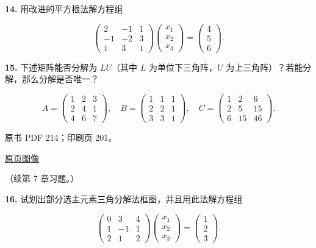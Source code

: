 \documentclass[
  10pt,
  fontset=fandol]{ctexart}
\begin{document}
\textbf{14.} 用改进的平方根法解方程组

\[
\begin{pmatrix}
2&-1&1\\
-1&-2&3\\
1&3&1
\end{pmatrix}
\begin{pmatrix}x_1\\x_2\\x_3\end{pmatrix}
=\begin{pmatrix}4\\5\\6\end{pmatrix}.
\]

\textbf{15.} 下述矩阵能否分解为 \(LU\)（其中 \(L\) 为单位下三角阵，\(U\)
为上三角阵）？若能分解，那么分解是否唯一？

\[
A=\begin{pmatrix}1&2&3\\2&4&1\\4&6&7\end{pmatrix},\quad
B=\begin{pmatrix}1&1&1\\2&2&1\\3&3&1\end{pmatrix},\quad
C=\begin{pmatrix}1&2&6\\2&5&15\\6&15&46\end{pmatrix}.
\]

\clearpage

原书 PDF 214；印刷页 201。

\href{../../../source-images/pdf-214.jpeg}{原页图像}

（续第 7 章习题。）

\textbf{16.} 试划出部分选主元素三角分解法框图，并且用此法解方程组

\[
\begin{pmatrix}0&3&4\\1&-1&1\\2&1&2\end{pmatrix}
\begin{pmatrix}x_1\\x_2\\x_3\end{pmatrix}
=\begin{pmatrix}1\\2\\3\end{pmatrix}.
\]
\end{document}
